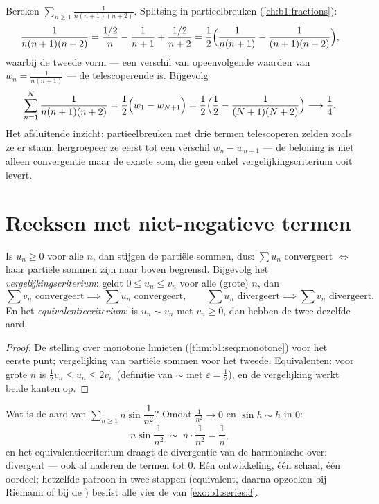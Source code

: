 \begin{example}\label{ex:b1:series:telescope3}
Bereken $\sum_{n\geq1} \frac{1}{n(n+1)(n+2)}$. Splitsing in
partieelbreuken (\cref{ch:b1:fractions}):
\[
\frac{1}{n(n+1)(n+2)}
= \frac{1/2}{n} - \frac{1}{n+1} + \frac{1/2}{n+2}
= \frac12\Bigl(\frac{1}{n(n+1)} - \frac{1}{(n+1)(n+2)}\Bigr),
\]
waarbij de tweede vorm --- een verschil van opeenvolgende waarden
van $w_n = \frac{1}{n(n+1)}$ --- de telescoperende is. Bijgevolg
\[
\sum_{n=1}^{N} \frac{1}{n(n+1)(n+2)}
= \frac12\Bigl(w_1 - w_{N+1}\Bigr)
= \frac12\Bigl(\frac12 - \frac{1}{(N+1)(N+2)}\Bigr)
\longrightarrow \frac14 .
\]
Het afsluitende inzicht: partieelbreuken met drie termen
telescoperen zelden zoals ze er staan; hergroepeer ze eerst tot
een verschil $w_n - w_{n+1}$ --- de beloning is niet alleen
convergentie maar de exacte som, die geen enkel
vergelijkingscriterium ooit levert.
\end{example}

\section{Reeksen met niet-negatieve termen}

\begin{theorem}\label{thm:b1:series:positive}
Is $u_n \geq 0$ voor alle $n$, dan stijgen de partiële sommen, dus:
$\sum u_n$ convergeert $\iff$ haar partiële sommen zijn naar boven
begrensd. Bijgevolg het \emph{vergelijkingscriterium}: geldt $0 \leq
u_n \leq v_n$ voor alle (grote) $n$, dan
\[
\sum v_n \text{ convergeert} \implies \sum u_n \text{ convergeert},
\qquad
\sum u_n \text{ divergeert} \implies \sum v_n \text{ divergeert}.
\]
En het \emph{equivalentiecriterium}: is $u_n \sim v_n$ met $v_n \geq
0$, dan hebben de twee  dezelfde aard.
\end{theorem}

\begin{proof}
De stelling over monotone limieten (\cref{thm:b1:seq:monotone}) voor
het eerste punt; vergelijking van partiële sommen voor het tweede.
Equivalenten: voor grote $n$ is $\frac12 v_n \leq u_n \leq 2 v_n$
(definitie van $\sim$ met $\varepsilon = \frac12$), en de
vergelijking werkt beide kanten op.
\end{proof}

\begin{example}\label{ex:b1:series:equivdiverge}
Wat is de aard van $\sum_{n\geq1} n\sin\dfrac{1}{n^2}$? Omdat
$\frac{1}{n^2} \to 0$ en $\sin h \sim h$ in $0$:
\[
n\sin\frac{1}{n^2} \;\sim\; n\cdot\frac{1}{n^2} = \frac1n ,
\]
en het equivalentiecriterium draagt de divergentie van de
harmonische  over: divergent --- ook al naderen de termen tot
$0$. Eén ontwikkeling, één schaal, één oordeel; hetzelfde patroon
in twee stappen (equivalent, daarna opzoeken bij Riemann of bij
de ) beslist alle vier de  van
\cref{exo:b1:series:3}.
\end{example}

